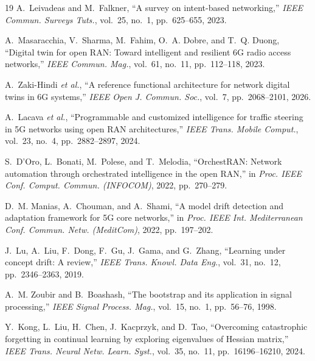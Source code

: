 \documentclass[conference]{IEEEtran}
\begin{document}
\begin{thebibliography}{19}
A.~Leivadeas and M.~Falkner, ``A survey on intent-based networking,'' \emph{IEEE Commun.
Surveys Tuts.}, vol.~25, no.~1, pp.~625--655, 2023.

A.~Masaracchia, V.~Sharma, M.~Fahim, O.~A. Dobre, and T.~Q. Duong, ``Digital twin for open RAN:
Toward intelligent and resilient 6G radio access networks,'' \emph{IEEE Commun. Mag.}, vol.~61,
no.~11, pp.~112--118, 2023.

A.~Zaki-Hindi \emph{et al.}, ``A reference functional architecture for network digital twins in
6G systems,'' \emph{IEEE Open J. Commun. Soc.}, vol.~7, pp.~2068--2101, 2026.

A.~Lacava \emph{et al.}, ``Programmable and customized intelligence for traffic steering in 5G
networks using open RAN architectures,'' \emph{IEEE Trans. Mobile Comput.}, vol.~23, no.~4,
pp.~2882--2897, 2024.

S.~D'Oro, L.~Bonati, M.~Polese, and T.~Melodia, ``OrchestRAN: Network automation through
orchestrated intelligence in the open RAN,'' in \emph{Proc. IEEE Conf. Comput. Commun.
(INFOCOM)}, 2022, pp.~270--279.

D.~M. Manias, A.~Chouman, and A.~Shami, ``A model drift detection and adaptation framework for
5G core networks,'' in \emph{Proc. IEEE Int. Mediterranean Conf. Commun. Netw. (MeditCom)},
2022, pp.~197--202.

J.~Lu, A.~Liu, F.~Dong, F.~Gu, J.~Gama, and G.~Zhang, ``Learning under concept drift: A
review,'' \emph{IEEE Trans. Knowl. Data Eng.}, vol.~31, no.~12, pp.~2346--2363, 2019.

A.~M. Zoubir and B.~Boashash, ``The bootstrap and its application in signal processing,''
\emph{IEEE Signal Process. Mag.}, vol.~15, no.~1, pp.~56--76, 1998.

Y.~Kong, L.~Liu, H.~Chen, J.~Kacprzyk, and D.~Tao, ``Overcoming catastrophic forgetting in
continual learning by exploring eigenvalues of Hessian matrix,'' \emph{IEEE Trans. Neural Netw.
Learn. Syst.}, vol.~35, no.~11, pp.~16196--16210, 2024.

\end{thebibliography}
\end{document}
